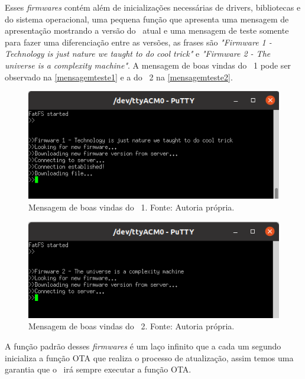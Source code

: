 Esses \textit{firmwares} contém além de inicializações necessárias de drivers, bibliotecas e do sistema operacional, uma pequena função que apresenta uma mensagem de apresentação mostrando a versão do \firmware\ atual e uma mensagem de teste somente para fazer uma diferenciação entre as versões, as frases são \textit{"Firmware 1 - Technology is just nature we taught to do cool trick"} e \textit{"Firmware 2 - The universe is a complexity machine"}. A mensagem de boas vindas do \firmware\ 1 pode ser observado na \autoref{mensagemteste1} e a do \firmware\ 2 na \autoref{mensagemteste2}. 

\begin{figure}[H]
    \scriptsize
     \centering
     \includegraphics[scale=1]{dados/figuras/mensagem1.png}
     \caption{Mensagem de boas vindas do \firmware\ 1. \newline Fonte: Autoria própria.}
     \label{mensagemteste1}
\end{figure}
\begin{figure}[H]
    \scriptsize
     \centering
     \includegraphics[scale=1]{dados/figuras/mensagem2.png}
     \caption{Mensagem de boas vindas do \firmware\ 2. \newline Fonte: Autoria própria.}
     \label{mensagemteste2}
\end{figure}

A função padrão desses \textit{firmwares} é um laço infinito que a cada um segundo inicializa a função OTA que realiza o processo de atualização, assim temos uma garantia que o \firmware\ irá sempre executar a função OTA.


